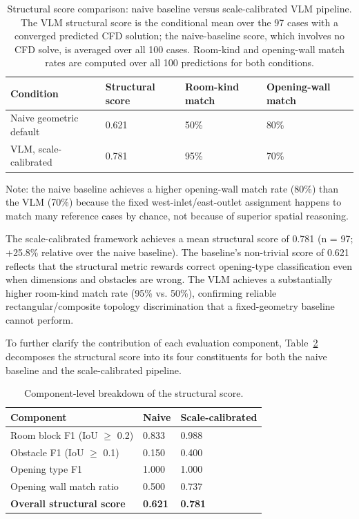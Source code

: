 \documentclass[preprint,12pt,number]{elsarticle}
\begin{document}
\begin{table}[htbp]
\centering
\caption{Structural score comparison: naive baseline versus scale-calibrated VLM pipeline. The VLM structural score is the conditional mean over the 97 cases with a converged predicted CFD solution; the naive-baseline score, which involves no CFD solve, is averaged over all 100 cases. Room-kind and opening-wall match rates are computed over all 100 predictions for both conditions.}
\label{tab:result-baseline-comparison}
\begin{tabular}{llll}
\toprule
Condition & Structural score & Room-kind match & Opening-wall match \\
\midrule
Naive geometric default & 0.621 & 50\% & 80\% \\
VLM, scale-calibrated & 0.781 & 95\% & 70\% \\
\bottomrule
\end{tabular}
\end{table}


Note: the naive baseline achieves a higher opening-wall match rate (80\%) than the VLM (70\%) because the fixed west-inlet/east-outlet assignment happens to match many reference cases by chance, not because of superior spatial reasoning.

The scale-calibrated framework achieves a mean structural score of 0.781 (n = 97; +25.8\% relative over the naive baseline). The baseline's non-trivial score of 0.621 reflects that the structural metric rewards correct opening-type classification even when dimensions and obstacles are wrong. The VLM achieves a substantially higher room-kind match rate (95\% vs. 50\%), confirming reliable rectangular/composite topology discrimination that a fixed-geometry baseline cannot perform.

To further clarify the contribution of each evaluation component, Table~\ref{tab:result-component-breakdown} decomposes the structural score into its four constituents for both the naive baseline and the scale-calibrated pipeline.

\begin{table}[htbp]
\centering
\caption{Component-level breakdown of the structural score.}
\label{tab:result-component-breakdown}
\begin{tabular}{lll}
\toprule
Component & Naive & Scale-calibrated \\
\midrule
Room block F1 (IoU $\geq$ 0.2) & 0.833 & 0.988 \\
Obstacle F1 (IoU $\geq$ 0.1) & 0.150 & 0.400 \\
Opening type F1 & 1.000 & 1.000 \\
Opening wall match ratio & 0.500 & 0.737 \\
\textbf{Overall structural score} & \textbf{0.621} & \textbf{0.781} \\
\bottomrule
\end{tabular}
\end{table}
\end{document}
